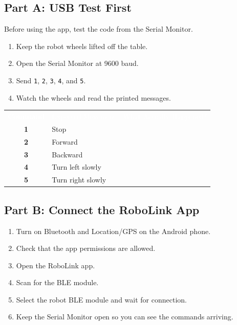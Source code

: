 \documentclass[11pt,letterpaper]{article}
\begin{document}
\subsection*{\textcolor{LabTeal}{Part A: USB Test First}}

Before using the app, test the code from the Serial Monitor.

\begin{enumerate}
  \item Keep the robot wheels lifted off the table.
  \item Open the Serial Monitor at 9600 baud.
  \item Send \texttt{1}, \texttt{2}, \texttt{3}, \texttt{4}, and \texttt{5}.
  \item Watch the wheels and read the printed messages.
\end{enumerate}

\begin{center}
\begin{tabularx}{\linewidth}{>{\bfseries}c X X}
\rowcolor{LabBlue}
\textcolor{white}{Command} & \textcolor{white}{Expected Movement} & \textcolor{white}{What Actually Happened?}\\
1 & Stop & \\
2 & Forward & \\
3 & Backward & \\
4 & Turn left slowly & \\
5 & Turn right slowly & \\
\end{tabularx}
\end{center}

\subsection*{\textcolor{LabTeal}{Part B: Connect the RoboLink App}}

\begin{enumerate}
  \item Turn on Bluetooth and Location/GPS on the Android phone.
  \item Check that the app permissions are allowed.
  \item Open the RoboLink app.
  \item Scan for the BLE module.
  \item Select the robot BLE module and wait for connection.
  \item Keep the Serial Monitor open so you can see the commands arriving.
\end{enumerate}
\end{document}
